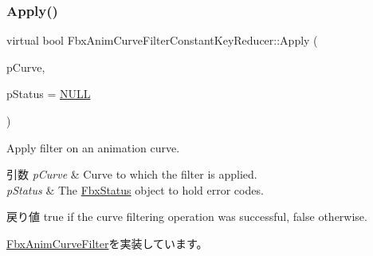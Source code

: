 \mbox{\label{class_fbx_anim_curve_filter_constant_key_reducer_a45c9f6f26dc37686d684e1a35ac6b4c0}} 
\subsubsection{\texorpdfstring{Apply()}{Apply()}\hspace{0.1cm}{\footnotesize\ttfamily [5/5]}}
{\footnotesize\ttfamily virtual bool Fbx\+Anim\+Curve\+Filter\+Constant\+Key\+Reducer\+::\+Apply (\begin{DoxyParamCaption}\item[{\hyperlink{class_fbx_anim_curve}{Fbx\+Anim\+Curve} \&}]{p\+Curve,  }\item[{\hyperlink{class_fbx_status}{Fbx\+Status} $\ast$}]{p\+Status = {\ttfamily \hyperlink{fbxarch_8h_a070d2ce7b6bb7e5c05602aa8c308d0c4}{N\+U\+LL}} }\end{DoxyParamCaption})\hspace{0.3cm}{\ttfamily [virtual]}}

Apply filter on an animation curve. 
\begin{DoxyParams}{引数}
{\em p\+Curve} & Curve to which the filter is applied. \\
\hline
{\em p\+Status} & The \hyperlink{class_fbx_status}{Fbx\+Status} object to hold error codes. \\
\hline
\end{DoxyParams}
\begin{DoxyReturn}{戻り値}
{\ttfamily true} if the curve filtering operation was successful, {\ttfamily false} otherwise. 
\end{DoxyReturn}


\hyperlink{class_fbx_anim_curve_filter_a6a69996c47c0e6f63a0f8b0d5fa806a0}{Fbx\+Anim\+Curve\+Filter}を実装しています。

\mbox{\label{class_fbx_anim_curve_filter_constant_key_reducer_adae1590528c85fe9c4186652c97d8d19}} 
